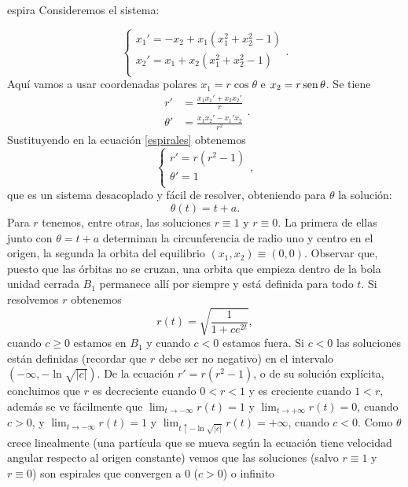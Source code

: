\begin{ejemplo}{espira} Consideremos el sistema:

\begin{equation}\label{espirales}
\left\{%
\begin{array}{l}
    x_1'=-x_2+x_1(x_1^2+x_2^2-1) \\
    x_2'=x_1+ x_2(x_1^2+x_2^2-1)\\
\end{array} .%
\right.
\end{equation}
 Aquí vamos a
usar coordenadas polares $x_1=r\cos \theta$ e $x_2=r\operatorname{sen} \theta$.
Se tiene
\[
    \begin{split}
    r'&=\frac{x_1x_1'+x_2x_2'}{r}\\
    \theta'&=\frac{x_1x_2'-x_1'x_2}{r^2}
    \end{split}.
\]
Sustituyendo en la ecuación \eqref{espirales} obtenemos
\begin{equation}\label{espirales2}
\left\{%
\begin{array}{l}
    r'=r(r^2-1) \\
    \theta'=1\\
\end{array} ,%
\right.
\end{equation}
que es un sistema desacoplado y fácil de resolver, obteniendo para
$\theta$ la solución:
\[
    \theta(t)=t+a.
\]
Para $r$ tenemos, entre otras,  las soluciones $r\equiv 1$ y
$r\equiv 0$. La primera de ellas junto con $\theta=t+a$ determinan
la circunferencia de radio uno y centro en el origen, la segunda
la orbita del equilibrio $(x_1,x_2)\equiv(0,0)$. Observar que,
puesto que las órbitas no se cruzan, una orbita que empieza dentro
de la bola unidad cerrada $B_1$ permanece allí por siempre y está
definida para todo $t$. Si  resolvemos $r$ obtenemos
\[
r(t)=\sqrt{\frac{1}{1+ce^{2t}}},
\]
cuando $c\geq 0$ estamos en $B_1$ y cuando $c<0$ estamos fuera. Si
$c<0$ las soluciones están definidas (recordar que $r$ debe ser no
negativo) en el intervalo $(-\infty,-\ln\sqrt{|c|})$. De la
ecuación $r'=r(r^2-1)$, o de su solución explícita, concluimos que
$r$ es decreciente cuando $0<r<1$ y es creciente cuando $1<r$,
además se ve fácilmente que $\lim_{t\to -\infty}r(t)=1$ y
$\lim_{t\to +\infty}r(t)=0$, cuando $c>0$, y $\lim_{t\to
-\infty}r(t)=1$ y $\lim_{t\uparrow -\ln \sqrt{|c|}}r(t)=+\infty$,
cuando $c<0$. Como $\theta$ crece linealmente (una partícula que
se mueva según la ecuación tiene velocidad angular respecto al
origen constante) vemos que las soluciones (salvo $r\equiv 1$ y
$r\equiv 0$) son espirales que convergen a $0$ ($c>0$) o infinito

\end{ejemplo}
